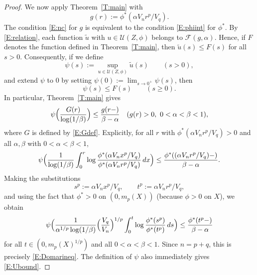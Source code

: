 \documentclass[10pt,a4paper]{amsart}
\newcommand{\cF}{\mathcal{F}}
\newcommand{\cU}{\mathcal{U}}
\renewcommand{\tilde}{\widetilde}
\begin{document}
\begin{proof}
We now apply Theorem~\ref{T:main} with
\[
g(r):=\phi^*(\alpha V_n r^p/V_q).
\]
The condition \eqref{E:nc} for $g$ 
is equivalent to the condition \eqref{E:phiint} for $\phi^*$.
By \eqref{E:relation}, each function $\tilde{u}$ with $u\in\cU(Z,\phi)$ belongs to $\cF(g,\alpha)$. Hence, if 
$F$ denotes the function defined in
Theorem~\ref{T:main}, then
$\tilde{u}(s)\le F(s)$ for all $s>0$.
Consequently, if we define
\[
\psi(s):=\sup_{u\in\mathcal U(Z,\phi)}\widetilde u(s) \qquad(s>0),
\]
and extend $\psi$ to $0$ by setting $\psi(0):=\lim_{s\to0^+}\psi(s)$,
then
\[
\psi(s)\le F(s)\qquad(s\ge0).
\]
In particular, Theorem~\ref{T:main} gives
\[
\psi\Bigl(\frac{G(r)}{\log(1/\beta)}\Bigr)
\le \frac{g(r-)}{\beta-\alpha}
\quad(g(r)>0,\ 0<\alpha<\beta<1),
\]
where $G$ is defined by \eqref{E:Gdef}.
Explicitly, for all $r$ with
$\phi^*(\alpha V_n r^p/V_q)>0$ and all $\alpha,\beta$ with
$0<\alpha<\beta<1$,
\[
\psi\Bigl(\frac{1}{\log(1/\beta)}\int_0^r
\log\frac{\phi^*(\alpha V_nx^p/V_q)}
{\phi^*(\alpha V_nr^p/V_q)}\,dx\Bigr)
\le
\frac{\phi^*((\alpha V_nr^p/V_q)-)}{\beta-\alpha}.
\]
Making the substitutions
\[
s^p:=\alpha V_nx^p/V_q,
\qquad
t^p:=\alpha V_nr^p/V_q,
\]
and using the fact that $\phi^*>0$ on $(0,m_p(X))$ (because
$\phi>0$ on $X$), we obtain
\[
\psi\Bigl(\frac{1}{\alpha^{1/p}\log(1/\beta)}
\Bigl(\frac{V_q}{V_n}\Bigr)^{1/p}
\int_0^t \log\frac{\phi^*(s^p)}{\phi^*(t^p)}\,ds\Bigr)
\le
\frac{\phi^*(t^p-)}{\beta-\alpha}
\]
for all $t\in(0,m_p(X)^{1/p})$ and all
$0<\alpha<\beta<1$. Since $n=p+q$, this is precisely
\eqref{E:Domarineq}. 
The definition of $\psi$ also immediately gives
\eqref{E:Ubound}.
\end{proof}
\end{document}
